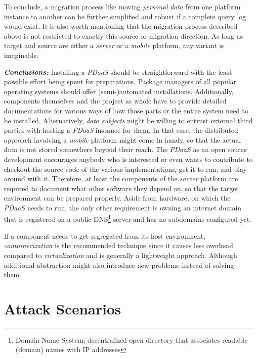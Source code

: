 \documentclass[12pt,english,a4paper,titlepage,cleardoublepage=empty,dottedtoc]{report}
\begin{document}
To conclude, a migration process like moving \emph{personal data} from
one platform instance to another can be further simplified and robust if
a complete query log would exist. It is also worth mentioning that the
migration process described above is not restricted to exactly this
source or migration direction. As long as target and source are either a
\emph{server} or a \emph{mobile} platform, any variant is imaginable.

\emph{\textbf{Conclusions:}} Installing a \emph{PDaaS} should be
straightforward with the least possible effort being spent for
preparations. Package managers of all popular operating systems should
offer (semi-)automated installations. Additionally, components
themselves and the project as whole have to provide detailed
documentations for various ways of how those parts or the entire system
need to be installed. Alternatively, \emph{data subjects} might be
willing to entrust external third parties with hosting a \emph{PDaaS}
instance for them. In that case, the distributed approach involving a
\emph{mobile} platform might come in handy, so that the actual data is
not stored somewhere beyond their reach. The \emph{PDaaS} as an open
source development encourages anybody who is interested or even wants to
contribute to checkout the source code of the various implementations,
get it to run, and play around with it. Therefore, at least the
components of the \emph{server} platform are required to document what
other software they depend on, so that the target environment can be
prepared properly. Aside from hardware, on which the \emph{PDaaS} needs
to run, the only other requirement is owning an internet domain that is
registered on a public DNS\footnote{Domain Name System; decentralized
  open directory that associates readable (domain) names with IP
  addresses} server and has no subdomains configured yet.

If a component needs to get segregated from its host environment,
\emph{containerization} is the recommended technique since it causes
less overhead compared to \emph{virtualization} and is generally a
lightweight approach. Although additional abstraction might also
introduce new problems instead of solving them.

\section{Attack Scenarios}\label{attack-scenarios}
\end{document}
